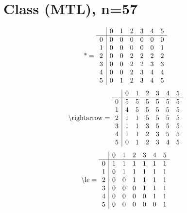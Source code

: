 \documentclass[11pt]{article}
\begin{document}
\section{Class (MTL), n=57}
\[\text{*} = 
\begin{array}{r | r r r r r r}
 & 0 & 1 & 2 & 3 & 4 & 5 \\ \hline
0 & 0 & 0 & 0 & 0 & 0 & 0 \\
1 & 0 & 0 & 0 & 0 & 0 & 1 \\
2 & 0 & 0 & 2 & 2 & 2 & 2 \\
3 & 0 & 0 & 2 & 2 & 3 & 3 \\
4 & 0 & 0 & 2 & 3 & 4 & 4 \\
5 & 0 & 1 & 2 & 3 & 4 & 5 \\
\end{array}
\]
\[\text{\textbackslash rightarrow} = 
\begin{array}{r | r r r r r r}
 & 0 & 1 & 2 & 3 & 4 & 5 \\ \hline
0 & 5 & 5 & 5 & 5 & 5 & 5 \\
1 & 4 & 5 & 5 & 5 & 5 & 5 \\
2 & 1 & 1 & 5 & 5 & 5 & 5 \\
3 & 1 & 1 & 3 & 5 & 5 & 5 \\
4 & 1 & 1 & 2 & 3 & 5 & 5 \\
5 & 0 & 1 & 2 & 3 & 4 & 5 \\
\end{array}
\]
\[\text{\textbackslash le} = 
\begin{array}{r | r r r r r r}
 & 0 & 1 & 2 & 3 & 4 & 5 \\ \hline
0 & 1 & 1 & 1 & 1 & 1 & 1 \\
1 & 0 & 1 & 1 & 1 & 1 & 1 \\
2 & 0 & 0 & 1 & 1 & 1 & 1 \\
3 & 0 & 0 & 0 & 1 & 1 & 1 \\
4 & 0 & 0 & 0 & 0 & 1 & 1 \\
5 & 0 & 0 & 0 & 0 & 0 & 1 \\
\end{array}
\]
\end{document}
